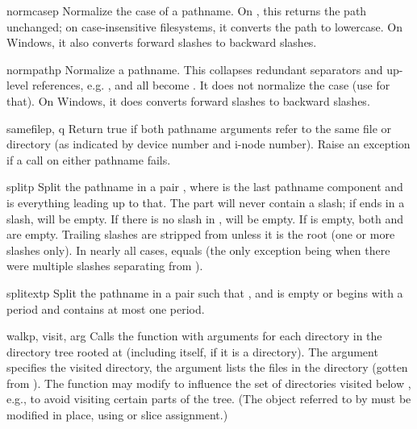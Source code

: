 \begin{funcdesc}{normcase}{p}
Normalize the case of a pathname.  On \UNIX{}, this returns the path
unchanged; on case-insensitive filesystems, it converts the path to
lowercase.  On Windows, it also converts forward slashes to backward
slashes.
\end{funcdesc}

\begin{funcdesc}{normpath}{p}
Normalize a pathname.  This collapses redundant separators and
up-level references, e.g. ,  and
 all become .  It does not normalize the
case (use  for that).  On Windows, it does
converts forward slashes to backward slashes.
\end{funcdesc}

\begin{funcdesc}{samefile}{p, q}
Return true if both pathname arguments refer to the same file or
directory (as indicated by device number and i-node number).
Raise an exception if a  call on either pathname
fails.
\end{funcdesc}

\begin{funcdesc}{split}{p}
Split the pathname  in a pair ,
where  is the last pathname component and  is
everything leading up to that.  The  part will never contain
a slash; if  ends in a slash,  will be empty.  If
there is no slash in ,  will be empty.  If  is
empty, both  and  are empty.  Trailing slashes are
stripped from  unless it is the root (one or more slashes
only).  In nearly all cases, 
equals  (the only exception being when there were multiple
slashes separating  from ).
\end{funcdesc}

\begin{funcdesc}{splitext}{p}
Split the pathname  in a pair 
such that ,
and  is empty or begins with a period and contains
at most one period.
\end{funcdesc}

\begin{funcdesc}{walk}{p, visit, arg}
Calls the function  with arguments
 for each directory in the
directory tree rooted at  (including  itself, if it is a
directory).  The argument  specifies the visited directory,
the argument  lists the files in the directory (gotten from
).
The  function may modify  to
influence the set of directories visited below , e.g., to
avoid visiting certain parts of the tree.  (The object referred to by
 must be modified in place, using  or slice
assignment.)
\end{funcdesc}
